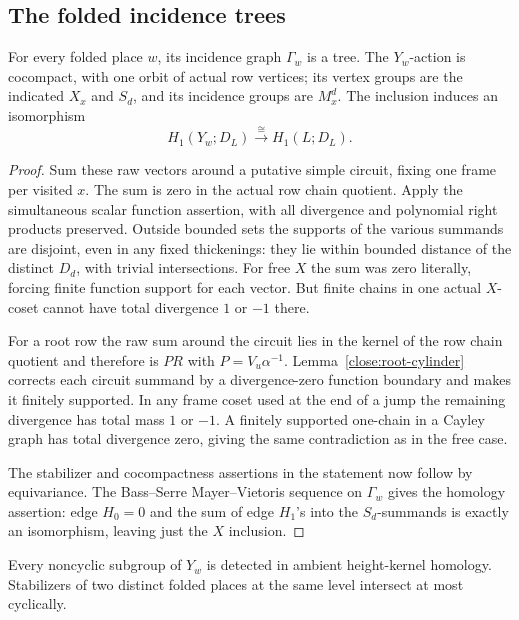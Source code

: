 \subsection{The folded incidence trees}

\begin{lemma}\label{close:folded-row}
For every folded place $w$, its incidence graph $\Gamma_w$ is a tree.
The $Y_w$-action is cocompact, with one orbit of actual row vertices;
its vertex groups are the indicated $X_x$ and $S_d$, and its incidence
groups are $M_x^d$. The inclusion induces an isomorphism
\[
 H_1(Y_w;D_L)\xrightarrow{\ \cong\ }H_1(L;D_L).
\]
\end{lemma}

\begin{proof}
Sum these raw vectors around a putative simple circuit, fixing one frame per visited \(x\). The sum is zero in the actual row chain quotient. Apply the simultaneous scalar function assertion, with all divergence and polynomial right products preserved. Outside bounded sets the supports of the various summands are disjoint, even in any fixed thickenings: they lie within bounded distance of the distinct \(D_d\), with trivial intersections. For free \(X\) the sum was zero literally, forcing finite function support for each vector. But finite chains in one actual \(X\)-coset cannot have total divergence \(1\) or \(-1\) there.

For a root row the raw sum around the circuit lies in the kernel of
the row chain quotient and therefore is $PR$ with
$P=V_u\alpha^{-1}$. Lemma~\ref{close:root-cylinder} corrects each
circuit summand by a divergence-zero function boundary and makes it
finitely supported. In any frame coset used at the end of a jump the
remaining divergence has total mass $1$ or $-1$. A finitely supported
one-chain in a Cayley graph has total divergence zero, giving the same
contradiction as in the free case.

The stabilizer and cocompactness assertions in the statement now follow by equivariance. The Bass--Serre Mayer--Vietoris sequence on \(\Gamma_w\) gives the homology assertion: edge \(H_0=0\) and the sum of edge \(H_1\)'s into the \(S_d\)-summands is exactly an isomorphism, leaving just the \(X\) inclusion.
\end{proof}

\begin{lemma}\label{close:folded-separation}
Every noncyclic subgroup of $Y_w$ is detected in ambient height-kernel
homology. Stabilizers of two distinct folded places at the same level
intersect at most cyclically.
\end{lemma}

